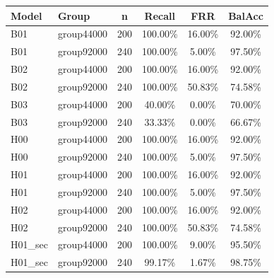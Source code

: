 \begin{tabular}{llcccc}
\hline
Model & Group & n & Recall & FRR & BalAcc \\
\hline
B01 & group44000 & 200 & 100.00\% & 16.00\% & 92.00\% \\
B01 & group92000 & 240 & 100.00\% & 5.00\% & 97.50\% \\
B02 & group44000 & 200 & 100.00\% & 16.00\% & 92.00\% \\
B02 & group92000 & 240 & 100.00\% & 50.83\% & 74.58\% \\
B03 & group44000 & 200 & 40.00\% & 0.00\% & 70.00\% \\
B03 & group92000 & 240 & 33.33\% & 0.00\% & 66.67\% \\
H00 & group44000 & 200 & 100.00\% & 16.00\% & 92.00\% \\
H00 & group92000 & 240 & 100.00\% & 5.00\% & 97.50\% \\
H01 & group44000 & 200 & 100.00\% & 16.00\% & 92.00\% \\
H01 & group92000 & 240 & 100.00\% & 5.00\% & 97.50\% \\
H02 & group44000 & 200 & 100.00\% & 16.00\% & 92.00\% \\
H02 & group92000 & 240 & 100.00\% & 50.83\% & 74.58\% \\
H01\_sec & group44000 & 200 & 100.00\% & 9.00\% & 95.50\% \\
H01\_sec & group92000 & 240 & 99.17\% & 1.67\% & 98.75\% \\
\hline
\end{tabular}
